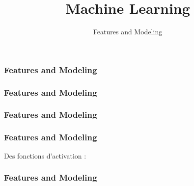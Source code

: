 \documentclass{formation}
\title{Machine Learning}
\subtitle{Features and Modeling}
\begin{document}
\maketitle

\begin{frame}
  \frametitle{Features and Modeling}
\end{frame}

\begin{frame}
  \frametitle{Features and Modeling}
\end{frame}

\begin{frame}
  \frametitle{Features and Modeling}
\end{frame}

\begin{frame}
  \frametitle{Features and Modeling}
  \begin{minipage}[c]{0.49\linewidth}
    Des fonctions d'activation :
  \end{minipage}\hfill
  \begin{minipage}[c]{0.50\linewidth}
  \end{minipage}\hfill
\end{frame}

\begin{frame}
  \frametitle{Features and Modeling}
\end{frame}
\end{document}
